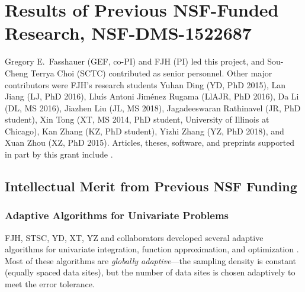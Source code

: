 \documentclass[11pt]{NSFamsart}
\begin{document}
\section{Results of Previous NSF-Funded Research,
NSF-DMS-1522687} \label{sec:Previous}

Gregory E.\ Fasshauer (GEF, co-PI) and FJH (PI) led this project, and Sou-Cheng Terrya Choi (SCTC) contributed as senior personnel.  Other major contributors were FJH's research students Yuhan Ding (YD, PhD 2015), Lan Jiang (LJ, PhD 2016), 
Llu\'is Antoni Jim\'enez Rugama (LlAJR, PhD 2016), Da Li (DL, MS 2016), Jiazhen Liu (JL, MS 2018), Jagadeeswaran Rathinavel (JR, 
PhD student), Xin Tong (XT, MS 2014, PhD student, University of Illinois at Chicago), Kan Zhang (KZ, PhD student), Yizhi Zhang (YZ, PhD 2018), and Xuan Zhou (XZ, PhD 2015).  Articles, theses,  
software, and preprints supported in 
part by this 
grant 
include 
\cite{ala_augmented_2017, 
	ChoEtal17a,
	ChoEtal17b,
	Din15a, 
	DinHic20a,
	GilEtal16a,
	Hic17a,
	HicJag18b,
	HicJim16a,
	HicEtal18a,
	HicEtal17a,
	HicKriWoz19a,
	RatHic19a,
	GilJim16b,
	JimHic16a,
	JohFasHic18a,
	Li16a,
	Liu17a,
	MarEtal18a,
	mccourt_stable_2017,
	MCCEtal19a,
	mishra_hybrid_2018,
	MisEtal19a,
	rashidinia_stable_2016,
	rashidinia_stable_2018,
	Zha18a,
	Zha17a,
	Zho15a,
	ZhoHic15a}.

\subsection{Intellectual Merit from Previous NSF Funding}
\label{previousmeritsubsec}

\subsubsection{Adaptive Algorithms for Univariate Problems} \label{sec:localadpat}
FJH, STSC, YD, XT, YZ and collaborators developed several adaptive algorithms for univariate integration, function approximation, and optimization \cite{ChoEtal17a,HicEtal14b,  Din15a, Ton14a, Zha18a}.  Most of these algorithms are \emph{globally adaptive}---the sampling density is constant (equally spaced data sites), but the number of data sites is chosen adaptively to meet the error tolerance.
\end{document}
